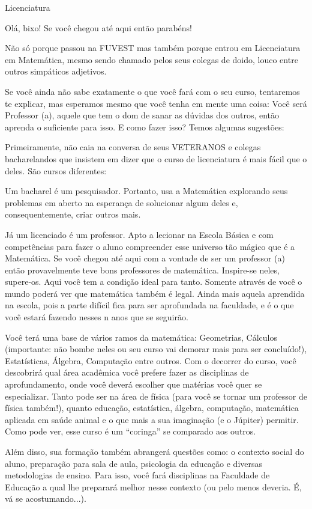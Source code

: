 \begin{subsecao}{Licenciatura}

Olá, bixo! Se você chegou até aqui então parabéns!

Não só porque passou na FUVEST mas também porque entrou em Licenciatura em
Matemática, mesmo sendo chamado pelos seus colegas de doido, louco entre
outros simpáticos adjetivos.

Se você ainda não sabe exatamente o que você fará com o seu curso, tentaremos
te explicar, mas esperamos mesmo que você tenha em mente uma coisa: Você será
Professor (a), aquele que tem o dom de sanar as dúvidas dos outros, então
aprenda o suficiente para isso. E como fazer isso? Temos algumas sugestões:

Primeiramente, não caia na conversa de seus VETERANOS e colegas bacharelandos
que insistem em dizer que o curso de licenciatura é mais fácil que o deles. São
cursos diferentes:

Um bacharel é um pesquisador. Portanto, usa a Matemática explorando seus
problemas em aberto na esperança de solucionar algum deles e, consequentemente,
criar outros mais.

Já um licenciado é um professor. Apto a lecionar na Escola Básica e com
competências para fazer o aluno compreender esse universo tão mágico que é a
Matemática. Se você chegou até aqui com a vontade de ser um professor (a) então
provavelmente teve bons professores de matemática. Inspire-se neles, supere-os.
Aqui você tem a condição ideal para tanto. Somente através de você o mundo
poderá ver que matemática também é legal. Ainda mais aquela aprendida na
escola, pois a parte difícil fica para ser aprofundada na faculdade, e é o que
você estará fazendo nesses n anos que se seguirão.

Você terá uma base de vários ramos da matemática: Geometrias,
Cálculos (importante: não bombe neles ou seu curso vai demorar mais para ser
concluído!), Estatísticas, Álgebra, Computação entre outros. Com o decorrer do
curso, você descobrirá qual área acadêmica você prefere fazer as disciplinas de
aprofundamento, onde você deverá escolher que matérias você quer se
especializar. Tanto pode ser na área de física (para você se tornar um
professor de física também!), quanto educação, estatística, álgebra,
computação, matemática aplicada em saúde animal e o que mais a sua
imaginação (e o Júpiter) permitir. Como pode ver, esse curso é um “coringa” se
comparado aos outros.

Além disso, sua formação também abrangerá questões como: o contexto social do
aluno, preparação para sala de aula, psicologia da educação e diversas
metodologias de ensino. Para isso, você fará disciplinas na Faculdade de
Educação a qual lhe preparará melhor nesse contexto (ou pelo menos deveria. É,
vá se acostumando...).


\end{subsecao}
